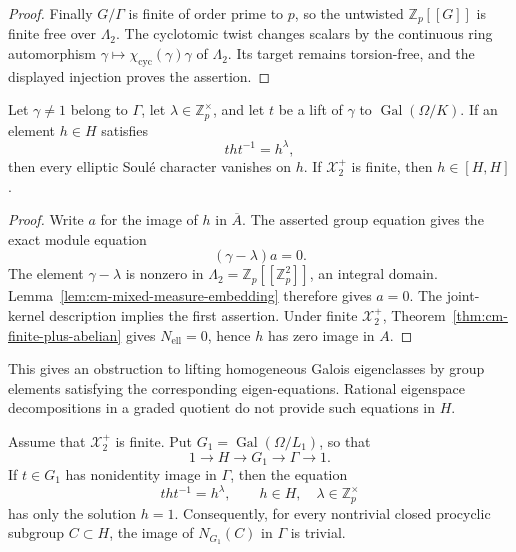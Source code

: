 \begin{proof}
Finally \(G/\Gamma\) is finite of order prime to \(p\), so the
untwisted \(\mathbb Z_p[[G]]\) is finite free over \(\Lambda_2\).
The cyclotomic twist changes scalars by the continuous ring
automorphism \(\gamma\mapsto\chi_{\mathrm{cyc}}(\gamma)\gamma\)
of \(\Lambda_2\).  Its target remains torsion-free, and the
displayed injection proves the assertion.
\end{proof}

\begin{lemma}\label{lem:cm-exact-eigenlift-obstruction}
Let \(\gamma\neq1\) belong to \(\Gamma\), let
\(\lambda\in\mathbb Z_p^\times\), and let \(t\) be a lift of
\(\gamma\) to \(\operatorname{Gal}(\Omega/K)\).
If an element \(h\in H\) satisfies
\[
                         tht^{-1}=h^\lambda ,
\]
then every elliptic Soul\'e character vanishes on \(h\).
If \(\mathcal X_2^+\) is finite, then \(h\in[H,H]\).
\end{lemma}

\begin{proof}
Write \(a\) for the image of \(h\) in \(\overline A\).
The asserted group equation gives the exact module equation
\[
                              (\gamma-\lambda)a=0.
\]
The element \(\gamma-\lambda\) is nonzero in
\(\Lambda_2=\mathbb Z_p[[\mathbb Z_p^2]]\), an integral domain.
Lemma~\ref{lem:cm-mixed-measure-embedding} therefore gives \(a=0\).
The joint-kernel description implies the first assertion.
Under finite \(\mathcal X_2^+\),
Theorem~\ref{thm:cm-finite-plus-abelian} gives
\(N_{\mathrm{ell}}=0\), hence \(h\) has zero image in \(A\).
\end{proof}

This gives an obstruction to lifting homogeneous
Galois eigenclasses by group elements satisfying the corresponding
eigen-equations.  Rational eigenspace decompositions in a graded
quotient do not provide such equations in \(H\).

\begin{proposition}\label{prop:cm-no-normalized-cyclic}
Assume that \(\mathcal X_2^+\) is finite.  Put
\(G_1=\operatorname{Gal}(\Omega/L_1)\), so that
\[
             1\longrightarrow H\longrightarrow G_1
               \longrightarrow\Gamma\longrightarrow1 .
\]
If \(t\in G_1\) has nonidentity image in \(\Gamma\), then the
equation
\[
                 tht^{-1}=h^\lambda,\qquad
                    h\in H,\quad\lambda\in\mathbb Z_p^\times
\]
has only the solution \(h=1\).
Consequently, for every nontrivial closed procyclic subgroup
\(C\subset H\), the image of \(N_{G_1}(C)\) in \(\Gamma\) is
trivial.
\end{proposition}

